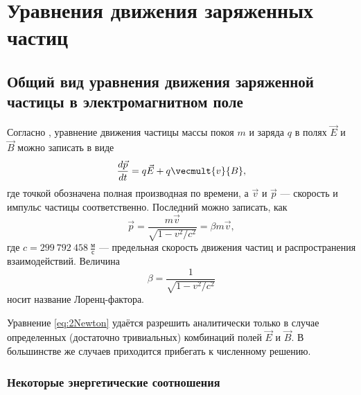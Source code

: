 
\chapter{Уравнения движения заряженных частиц} \label{ch2}



\section{Общий вид уравнения движения заряженной частицы в электромагнитном поле}

Согласно \cite{Landau2}, уравнение движения частицы массы покоя $m$ и заряда $q$ в полях $\vec{E}$ и $\vec{B}$ можно записать в виде
\begin{equation}
\frac{d \vec{p}}{dt} = q \vec{E} + q \vecmult{v}{B},
\label{eq:2Newton}
\end{equation} 
где точкой обозначена полная производная по времени, а $\vec{v}$ и $\vec{p}$ --- скорость и импульс частицы соответственно. Последний можно записать, как
\begin{equation}
\vec{p} = \frac{m \vec{v}}{\sqrt{1 - v^2/c^2}} = \beta m \vec{v},
\label{eq:rel_pulse}
\end{equation}
где $c = 299\ 792\ 458\ \frac{\text{м}}{\text{с}}$ --- предельная скорость движения частиц и распространения взаимодействий. Величина 
\begin{equation}
\beta = \frac{1}{\sqrt{1 - v^2/c^2}}
\end{equation}
носит название Лоренц-фактора.

Уравнение \eqref{eq:2Newton} удаётся разрешить аналитически только в случае определенных (достаточно тривиальных) комбинаций полей $\vec{E}$ и $\vec{B}$. В большинстве же случаев приходится прибегать к численному решению.

\subsection{Некоторые энергетические соотношения}

